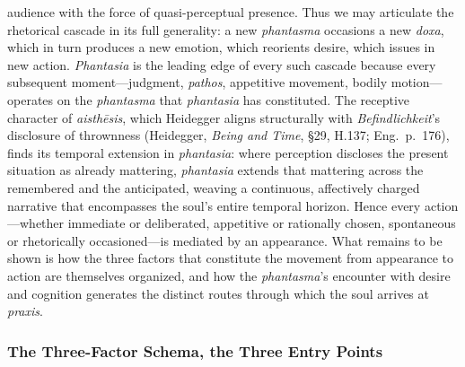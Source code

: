 audience with the force of quasi-perceptual presence. Thus we may articulate the rhetorical cascade in its full generality: a new \textit{phantasma} occasions a new \textit{doxa}, which in turn produces a new emotion, which reorients desire, which issues in new action. \textit{Phantasia} is the leading edge of every such cascade because every subsequent moment---judgment, \textit{pathos}, appetitive movement, bodily motion---operates on the \textit{phantasma} that \textit{phantasia} has constituted. The receptive character of \textit{aisth\={e}sis}, which Heidegger aligns structurally with \textit{Befindlichkeit}'s disclosure of thrownness (Heidegger, \textit{Being and Time}, \S29, H.137; Eng.~p.~176), finds its temporal extension in \textit{phantasia}: where perception discloses the present situation as already mattering, \textit{phantasia} extends that mattering across the remembered and the anticipated, weaving a continuous, affectively charged narrative that encompasses the soul's entire temporal horizon. Hence every action---whether immediate or deliberated, appetitive or rationally chosen, spontaneous or rhetorically occasioned---is mediated by an appearance. What remains to be shown is how the three factors that constitute the movement from appearance to action are themselves organized, and how the \textit{phantasma}'s encounter with desire and cognition generates the distinct routes through which the soul arrives at \textit{praxis}.


\subsubsection*{The Three-Factor Schema, the Three Entry Points}

